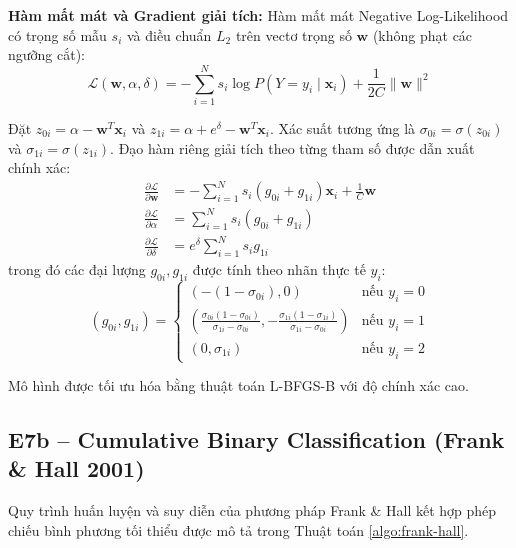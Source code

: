 \textbf{Hàm mất mát và Gradient giải tích:}
Hàm mất mát Negative Log-Likelihood có trọng số mẫu $s_i$ và điều chuẩn $L_2$ trên vectơ trọng số $\mathbf{w}$ (không phạt các ngưỡng cắt):
\begin{equation}
    \mathcal{L}(\mathbf{w}, \alpha, \delta) = - \sum_{i=1}^N s_i \log P(Y = y_i \mid \mathbf{x}_i) + \frac{1}{2C} \|\mathbf{w}\|^2
\end{equation}

Đặt $z_{0i} = \alpha - \mathbf{w}^T \mathbf{x}_i$ và $z_{1i} = \alpha + e^\delta - \mathbf{w}^T \mathbf{x}_i$. Xác suất tương ứng là $\sigma_{0i} = \sigma(z_{0i})$ và $\sigma_{1i} = \sigma(z_{1i})$. Đạo hàm riêng giải tích theo từng tham số được dẫn xuất chính xác:
\begin{align}
    \frac{\partial \mathcal{L}}{\partial \mathbf{w}} &= - \sum_{i=1}^N s_i (g_{0i} + g_{1i}) \mathbf{x}_i + \frac{1}{C} \mathbf{w} \\
    \frac{\partial \mathcal{L}}{\partial \alpha} &= \sum_{i=1}^N s_i (g_{0i} + g_{1i}) \\
    \frac{\partial \mathcal{L}}{\partial \delta} &= e^\delta \sum_{i=1}^N s_i g_{1i}
\end{align}
trong đó các đại lượng $g_{0i}, g_{1i}$ được tính theo nhãn thực tế $y_i$:
\begin{equation}
    (g_{0i}, g_{1i}) = \begin{cases} (-(1 - \sigma_{0i}), 0) & \text{nếu } y_i = 0 \\ \left(\frac{\sigma_{0i}(1 - \sigma_{0i})}{\sigma_{1i} - \sigma_{0i}}, -\frac{\sigma_{1i}(1 - \sigma_{1i})}{\sigma_{1i} - \sigma_{0i}}\right) & \text{nếu } y_i = 1 \\ (0, \sigma_{1i}) & \text{nếu } y_i = 2 \end{cases}
\end{equation}

Mô hình được tối ưu hóa bằng thuật toán L-BFGS-B với độ chính xác cao.

\subsection{E7b – Cumulative Binary Classification (Frank \& Hall 2001)}
Quy trình huấn luyện và suy diễn của phương pháp Frank \& Hall kết hợp phép chiếu bình phương tối thiểu được mô tả trong Thuật toán \ref{algo:frank-hall}.

